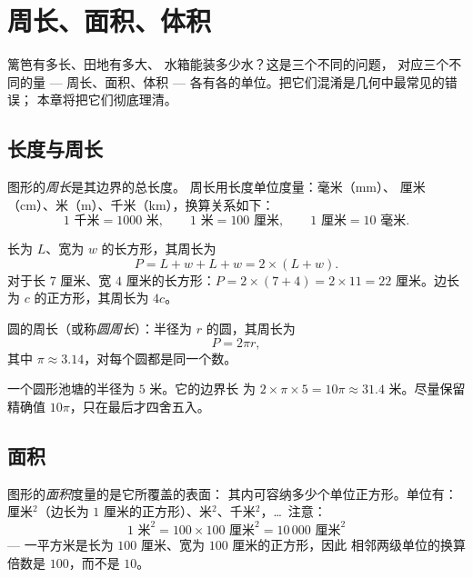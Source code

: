 \chapter{周长、面积、体积}\label{ch:g6:measure}

篱笆有多长、田地有多大、
水箱能装多少水？这是三个不同的问题，
对应三个不同的量 --- 周长、面积、体积 ---
各有各的单位。把它们混淆是几何中最常见的错误；
本章将把它们彻底理清。

\section{长度与周长}

\begin{definition}[周长]\label{def:g6:measure:perimeter}
图形的\emph{周长}是其边界的总长度。
周长用长度单位度量：毫米（mm）、
厘米（cm）、米（m）、千米（km），换算关系如下：
\[
1 \text{ 千米} = 1000 \text{ 米}, \qquad
1 \text{ 米} = 100 \text{ 厘米}, \qquad
1 \text{ 厘米} = 10 \text{ 毫米}.
\]
\end{definition}

\begin{example}\label{ex:g6:measure:perimeter}
长为 $L$、宽为 $w$ 的长方形，其周长为
\[
P = L + w + L + w = 2 \times (L + w).
\]
对于长 $7$ 厘米、宽 $4$ 厘米的长方形：$P = 2 \times (7 + 4) = 2 \times 11 =
22$ 厘米。边长为 $c$ 的正方形，其周长为 $4c$。
\end{example}

\begin{proposition}[圆的周长]\label{prop:g6:measure:circle}
圆的周长（或称\emph{圆周长}）：半径为 $r$ 的圆，其周长为
\[
P = 2 \pi r ,
\]
其中 $\pi \approx 3.14$，对每个圆都是同一个数。
\end{proposition}
\admitted

\begin{example}
一个圆形池塘的半径为 $5$ 米。它的边界长
为 $2 \times \pi \times 5 = 10\pi \approx 31.4$ 米。尽量保留精确值
$10\pi$，只在最后才四舍五入。
\end{example}

\section{面积}

\begin{definition}[面积]\label{def:g6:measure:area}
图形的\emph{面积}度量的是它所覆盖的表面：
其内可容纳多少个单位正方形。单位有：厘米$^2$（边长为
$1$ 厘米的正方形）、米$^2$、千米$^2$，\dots\ 注意：
\[
1 \text{ 米}^2 = 100 \times 100 \text{ 厘米}^2 = 10\,000 \text{ 厘米}^2
\]
--- 一平方米是长为 $100$ 厘米、宽为 $100$ 厘米的正方形，因此
相邻两级单位的换算倍数是 $100$，而不是 $10$。
\end{definition}

